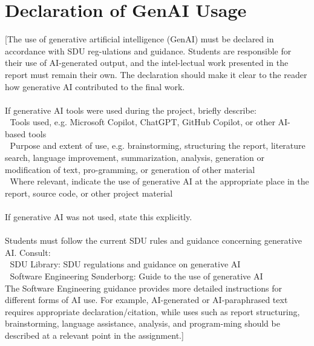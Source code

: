 \chapter*{Declaration of GenAI Usage}
[The use of generative artificial intelligence (GenAI) must be declared in accordance with SDU reg-ulations and guidance. Students are responsible for their use of AI-generated output, and the intel-lectual work presented in the report must remain their own. The declaration should make it clear to the reader how generative AI contributed to the final work.\\
\\
If generative AI tools were used during the project, briefly describe:\\
	Tools used, e.g. Microsoft Copilot, ChatGPT, GitHub Copilot, or other AI-based tools\\
	Purpose and extent of use, e.g. brainstorming, structuring the report, literature search, language improvement, summarization, analysis, generation or modification of text, pro-gramming, or generation of other material\\
	Where relevant, indicate the use of generative AI at the appropriate place in the report, source code, or other project material\\
\\
If generative AI was not used, state this explicitly.\\
\\
Students must follow the current SDU rules and guidance concerning generative AI. Consult:\\
	SDU Library: SDU regulations and guidance on generative AI\\
	Software Engineering Sønderborg: Guide to the use of generative AI\\

The Software Engineering guidance provides more detailed instructions for different forms of AI use. For example, AI-generated or AI-paraphrased text requires appropriate declaration/citation, while uses such as report structuring, brainstorming, language assistance, analysis, and program-ming should be described at a relevant point in the assignment.]
